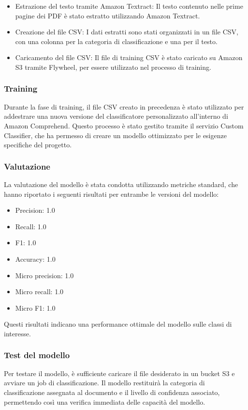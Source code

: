 \begin{itemize}
    \item Estrazione del testo tramite Amazon Textract: Il testo contenuto nelle prime pagine dei PDF è stato estratto utilizzando Amazon Textract.
    \item Creazione del file CSV: I dati estratti sono stati organizzati in un file CSV, con una colonna per la categoria di classificazione e una per il testo.
    \item Caricamento del file CSV: Il file di training CSV è stato caricato su Amazon S3 tramite Flywheel, per essere utilizzato nel processo di training.
\end{itemize}

\subsubsection{Training}
Durante la fase di training, il file CSV creato in precedenza è stato utilizzato per addestrare una nuova versione del classificatore personalizzato all'interno di Amazon Comprehend. Questo processo è stato gestito tramite il servizio Custom Classifier, che ha permesso di creare un modello ottimizzato per le esigenze specifiche del progetto.

\subsubsection{Valutazione}
La valutazione del modello è stata condotta utilizzando metriche standard, che hanno riportato i seguenti risultati per entrambe le versioni del modello:

\begin{itemize}
    \item Precision: 1.0
    \item Recall: 1.0
    \item F1: 1.0
    \item Accuracy: 1.0
    \item Micro precision: 1.0
    \item Micro recall: 1.0
    \item Micro F1: 1.0
\end{itemize}

Questi risultati indicano una performance ottimale del modello sulle classi di interesse.

\subsubsection{Test del modello}
Per testare il modello, è sufficiente caricare il file desiderato in un bucket S3 e avviare un job di classificazione. Il modello restituirà la categoria di classificazione assegnata al documento e il livello di confidenza associato, permettendo così una verifica immediata delle capacità del modello.

